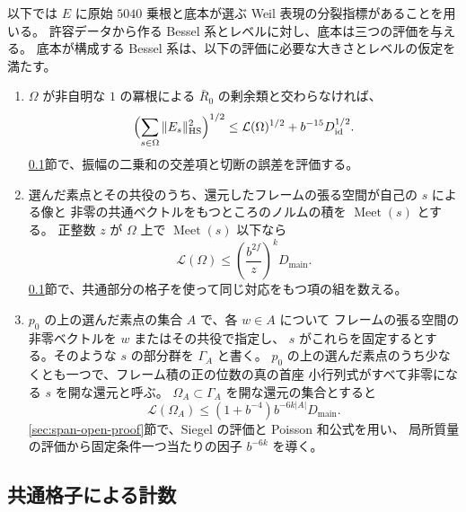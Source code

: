 以下では \(E\) に原始 \(5040\) 乗根と底本が選ぶ Weil 表現の分裂指標があることを用いる。
許容データから作る Bessel 系とレベルに対し、底本は三つの評価を与える。
底本が構成する Bessel 系は、以下の評価に必要な大きさとレベルの仮定を満たす。

\begin{enumerate}
\item
\(\Omega\) が非自明な \(1\) の冪根による \(\bar R_0\) の剰余類と交わらなければ、
\begin{equation}\label{eq:span-cutoff}
 \Bigl(\sum_{s\in\Omega}\|E_s\|_{\mathrm{HS}}^2\Bigr)^{1/2}
 \leq \mathcal L(\Omega)^{1/2}+b^{-15}D_{\mathrm{id}}^{1/2}.
\end{equation}
\ref{sec:span-pair-count}節で、振幅の二乗和の交差項と切断の誤差を評価する。
\item
選んだ素点とその共役のうち、還元したフレームの張る空間が自己の \(s\) による像と
非零の共通ベクトルをもつところのノルムの積を \(\operatorname{Meet}(s)\) とする。
正整数 \(z\) が \(\Omega\) 上で \(\operatorname{Meet}(s)\) 以下なら
\begin{equation}\label{eq:span-intersect}
 \mathcal L(\Omega)\leq
       \left(\frac{b^{2f}}z\right)^k D_{\mathrm{main}} .
\end{equation}
\ref{sec:span-pair-count}節で、共通部分の格子を使って同じ対応をもつ項の組を数える。
\item
\(p_0\) の上の選んだ素点の集合 \(A\) で、各 \(w\in A\) について
フレームの張る空間の非零ベクトルを \(w\) またはその共役で指定し、
\(s\) がこれらを固定するとする。そのような \(s\) の部分群を \(\Gamma_A\) と書く。
\(p_0\) の上の選んだ素点のうち少なくとも一つで、フレーム積の正の位数の真の首座
小行列式がすべて非零になる \(s\) を開な還元と呼ぶ。
\(\Omega_A\subset\Gamma_A\) を開な還元の集合とすると
\begin{equation}\label{eq:span-open-input}
 \mathcal L(\Omega_A)\leq (1+b^{-4})b^{-6k|A|}D_{\mathrm{main}}.
\end{equation}
\ref{sec:span-open-proof}節で、Siegel の評価と Poisson 和公式を用い、
局所質量の評価から固定条件一つ当たりの因子 \(b^{-6k}\) を導く。
\end{enumerate}

\subsection{共通格子による計数}\label{sec:span-pair-count}

